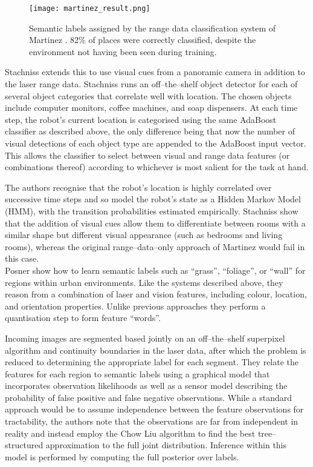 \begin{figure}[tb]
\centering
\texttt{[image: martinez\_result.png]}
\caption{Semantic labels assigned by the range data classification
  system of Martinez \etal \cite{Mozos05}. 82\% of places were
  correctly classified, despite the environment not having been seen
  during training.}
\label{fig:martinez-result}
\end{figure}

Stachniss \etal \cite{Stachniss05} extends this to use visual cues
from a panoramic camera in addition to the laser range data. Stachniss
runs an off--the--shelf object detector for each of several object
categories that correlate well with location. The chosen objects
include computer monitors, coffee machines, and soap dispensers. At
each time step, the robot's current location is categorised using the
same AdaBoost classifier as described above, the only difference being
that now the number of visual detections of each object type are
appended to the AdaBoost input vector. This allows the classifier to
select between visual and range data features (or combinations
thereof) according to whichever is most salient for the task at hand.

The authors recognise that the robot's location is highly correlated
over successive time steps and so model the robot's state as a Hidden
Markov Model (HMM), with the transition probabilities estimated
empirically. Stachniss \etal show that the addition of visual cues
allow them to differentiate between rooms with a similar shape but
different visual appearance (such as bedrooms and living rooms),
whereas the original range--data--only approach of Martinez would fail
in this case.\\

Posner \etal \cite{Posner08} show how to learn semantic labels such as
``grass'', ``foliage'', or ``wall'' for regions within urban
environments. Like the systems described above, they reason from a
combination of laser and vision features, including colour, location,
and orientation properties. Unlike previous approaches they perform a
quantisation step to form feature ``words''.

Incoming images are segmented based jointly on an off--the--shelf
superpixel algorithm and continuity boundaries in the laser data,
after which the problem is reduced to determining the appropriate
label for each segment. They relate the features for each region to
semantic labels using a graphical model that incorporates observation
likelihoods as well as a sensor model describing the probability of
false positive and false negative observations. While a standard
approach would be to assume independence between the feature
observations for tractability, the authors note that the observations
are far from independent in reality and instead employ the Chow Liu
algorithm to find the best tree--structured approximation to the full
joint distribution. Inference within this model is performed by
computing the full posterior over labels.


